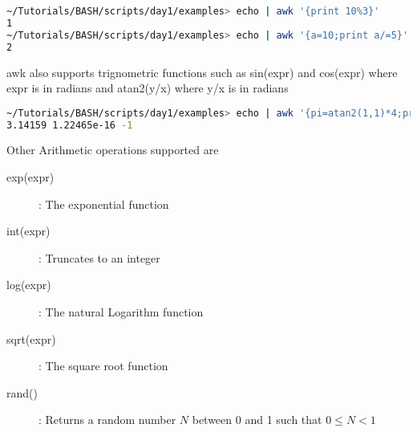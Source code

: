 \documentclass[slidestop,mathserif,compress,xcolor=svgnames]{beamer}
\begin{document}
\begin{frame}
\begin{itemize}
{\begin{columns}
\begin{center}
    \end{center}
    \end{columns}
    \begin{lstlisting}[language=bash]
~/Tutorials/BASH/scripts/day1/examples> echo | awk '{print 10%3}'
1
~/Tutorials/BASH/scripts/day1/examples> echo | awk '{a=10;print a/=5}'
2
    \end{lstlisting}
    \item awk also supports trignometric functions such as sin(expr) and cos(expr) where expr is in radians and atan2(y/x) where y/x is in radians
    \begin{lstlisting}[language=bash]
~/Tutorials/BASH/scripts/day1/examples> echo | awk '{pi=atan2(1,1)*4;print pi,sin(pi),cos(pi)}'
3.14159 1.22465e-16 -1
    \end{lstlisting}
    \item Other Arithmetic operations supported are
    \begin{description}
      \item[exp(expr)]: The exponential function
      \item[int(expr)]: Truncates to an integer
      \item[log(expr)]: The natural Logarithm function
      \item[sqrt(expr)]: The square root function
      \item[rand()]: Returns a random number $N$ between 0 and 1 such that $0\le N < 1$

\end{description}}
\end{itemize}
\end{frame}
\end{document}
